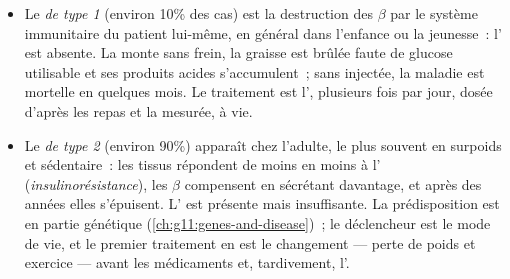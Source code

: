 \begin{proposition}\label{prop:g12:glucose-and-diabetes:types}
\begin{itemize}
  \item Le \emph{ de type 1} (environ 10\% des cas) est la
        destruction des  $\beta$ par le système immunitaire du
        patient lui-même, en général dans l'enfance ou la jeunesse~:
        l' est absente. La  monte sans frein, la
        graisse est brûlée faute de glucose utilisable et ses produits
        acides s'accumulent~; sans  injectée, la maladie est
        mortelle en quelques mois. Le traitement est l',
        plusieurs fois par jour, dosée d'après les repas et la
         mesurée, à vie.
  \item Le \emph{ de type 2} (environ 90\%) apparaît chez
        l'adulte, le plus souvent en surpoids et sédentaire~: les
        tissus répondent de moins en moins à l'
        (\emph{insulinorésistance}), les  $\beta$ compensent
        en sécrétant davantage, et après des années elles s'épuisent.
        L' est présente mais insuffisante. La prédisposition
        est en partie génétique (\cref{ch:g11:genes-and-disease})~; le
        déclencheur est le mode de vie, et le premier traitement en
        est le changement --- perte de poids et exercice --- avant les
        médicaments et, tardivement, l'.
\end{itemize}
\end{proposition}
